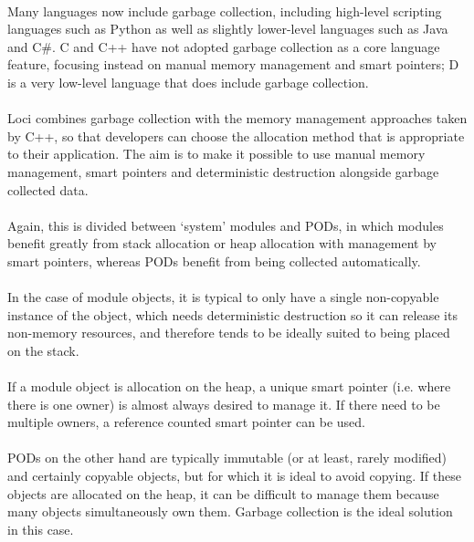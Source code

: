 \documentclass[12pt,twoside,notitlepage]{report}
\begin{document}
\paragraph{}
Many languages now include garbage collection, including high-level scripting languages such as Python as well as slightly lower-level languages such as Java and C\#. C and C++ have not adopted garbage collection as a core language feature, focusing instead on manual memory management and smart pointers; D is a very low-level language that does include garbage collection.

\paragraph{}
Loci combines garbage collection with the memory management approaches taken by C++, so that developers can choose the allocation method that is appropriate to their application. The aim is to make it possible to use manual memory management, smart pointers and deterministic destruction alongside garbage collected data.

\paragraph{}
Again, this is divided between `system' modules and PODs, in which modules benefit greatly from stack allocation or heap allocation with management by smart pointers, whereas PODs benefit from being collected automatically.

\paragraph{}
In the case of module objects, it is typical to only have a single non-copyable instance of the object, which needs deterministic destruction so it can release its non-memory resources, and therefore tends to be ideally suited to being placed on the stack.

\paragraph{}
If a module object is allocation on the heap, a unique smart pointer (i.e. where there is one owner) is almost always desired to manage it. If there need to be multiple owners, a reference counted smart pointer can be used.

\paragraph{}
PODs on the other hand are typically immutable (or at least, rarely modified) and certainly copyable objects, but for which it is ideal to avoid copying. If these objects are allocated on the heap, it can be difficult to manage them because many objects simultaneously own them. Garbage collection is the ideal solution in this case.
\end{document}
